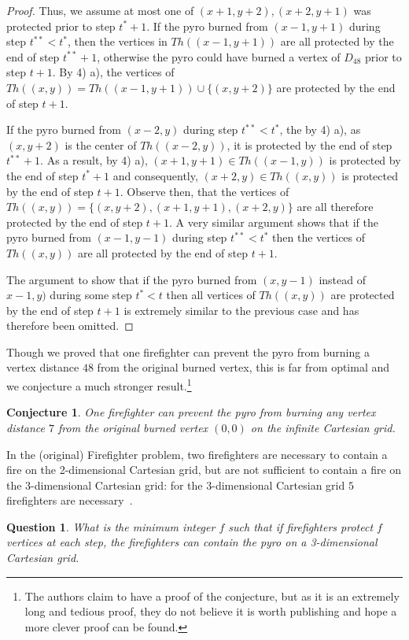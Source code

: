 \documentclass[12pt]{article}
\newtheorem{question}[theorem]{Question}
\newtheorem{conjecture}[theorem]{Conjecture}
\begin{document}
\begin{proof}
Thus, we assume at most one of $(x+1,y+2),(x+2,y+1)$ was protected prior to step $t^*+1$.  If the pyro burned from $(x-1,y+1)$ during step $t^{**}< t^*$, then the vertices in $Th((x-1,y+1))$ are all protected by the end of step $t^{**}+1$, otherwise the pyro could have burned a vertex of $D_{48}$ prior to step $t+1$.  By 4) a), the vertices of $Th((x,y)) = Th((x-1,y+1)) \cup \{(x,y+2)\}$ are protected by the end of step $t+1$.

If the pyro burned from $(x-2,y)$ during step $t^{**}<t^*$, the by 4) a), as $(x,y+2)$ is the center of $Th((x-2,y))$, it is protected by the end of step $t^{**}+1$.  As a result, by 4) a), $(x+1,y+1) \in Th((x-1,y))$ is protected by the end of step $t^*+1$ and consequently, $(x+2,y) \in Th((x,y))$ is protected by the end of step $t+1$.  Observe then, that the vertices of $Th((x,y)) = \{(x,y+2),(x+1,y+1),(x+2,y)\}$ are all therefore protected by the end of step $t+1$.   A very similar argument shows that if the pyro burned from $(x-1,y-1)$ during step $t^{**}<t^*$ then the vertices of $Th((x,y))$ are all protected by the end of step $t+1$.

The argument to show that if the pyro burned from $(x,y-1)$ instead of $x-1,y)$ during some step $t^*<t$ then all vertices of $Th((x,y))$ are protected by the end of step $t+1$ is extremely similar to the previous case and has therefore been omitted.\end{proof}

Though we proved that one firefighter can prevent the pyro from burning a vertex distance $48$ from the original burned vertex, this is far from optimal and we conjecture a much stronger result.\footnote{The authors claim to have a proof of the conjecture, but as it is an extremely long and tedious proof, they do not believe it is worth publishing and hope a more clever proof can be found.}

\begin{conjecture} One firefighter can prevent the pyro from burning any vertex distance $7$ from the original burned vertex $(0,0)$ on the infinite Cartesian grid.\end{conjecture}

In the (original) Firefighter problem, two firefighters are necessary to contain a fire on the 2-dimensional Cartesian grid, but are not sufficient to contain a fire on the 3-dimensional Cartesian grid: for the 3-dimensional Cartesian grid $5$ firefighters are necessary~\cite{hartke}.   
\begin{question}\label{thm:3d}
What is the minimum integer $f$ such that if firefighters protect $f$ vertices at each step, the firefighters can contain the pyro on a 3-dimensional Cartesian grid.
\end{question}
\end{document}
